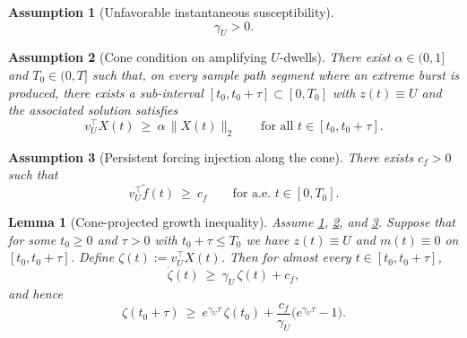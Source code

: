\documentclass[10pt,a4paper]{amsart}
\newtheorem{assumption}{Assumption}
\newtheorem{lemma}{Lemma}
\begin{document}
\begin{assumption}[Unfavorable instantaneous susceptibility]\label{ass:gammaU_positive_cone}
	\begin{equation}\label{eq:gammaU_pos_cone}
		\gamma_U>0.
	\end{equation}
\end{assumption}

\begin{assumption}[Cone condition on amplifying $U$-dwells]\label{ass:cone_condition}
	There exist $\alpha\in(0,1]$ and $T_0\in(0,T]$ such that, on every sample path segment where an extreme burst is produced,
	there exists a sub-interval $[t_0,t_0+\tau]\subset[0,T_0]$ with $z(t)\equiv U$ and the associated solution satisfies
	\begin{equation}\label{eq:cone}
		v_U^\top X(t)\ \ge\ \alpha\,\|X(t)\|_2
		\qquad \text{for all } t\in[t_0,t_0+\tau].
	\end{equation}
\end{assumption}

\begin{assumption}[Persistent forcing injection along the cone]\label{ass:forcing_in_cone}
	There exists $c_f>0$ such that
	\begin{equation}\label{eq:forcing_cone}
		v_U^\top \widetilde f(t)\ \ge\ c_f
		\qquad \text{for a.e.\ } t\in[0,T_0].
	\end{equation}
\end{assumption}

\begin{lemma}[Cone-projected growth inequality]\label{lem:cone_projected_growth}
	Assume \ref{ass:gammaU_positive_cone}, \ref{ass:cone_condition}, and \ref{ass:forcing_in_cone}.
	Suppose that for some $t_0\ge 0$ and $\tau>0$ with $t_0+\tau\le T_0$ we have $z(t)\equiv U$ and $m(t)\equiv 0$ on $[t_0,t_0+\tau]$.
	Define $\zeta(t):=v_U^\top X(t)$. Then for almost every $t\in[t_0,t_0+\tau]$,
	\begin{equation}\label{eq:zeta_cone_ineq}
		\dot\zeta(t)\ \ge\ \gamma_U\,\zeta(t)+c_f,
	\end{equation}
	and hence
	\begin{equation}\label{eq:zeta_cone_solution}
		\zeta(t_0+\tau)\ \ge\ e^{\gamma_U\tau}\,\zeta(t_0)+\frac{c_f}{\gamma_U}\Big(e^{\gamma_U\tau}-1\Big).
	\end{equation}
\end{lemma}
\end{document}
